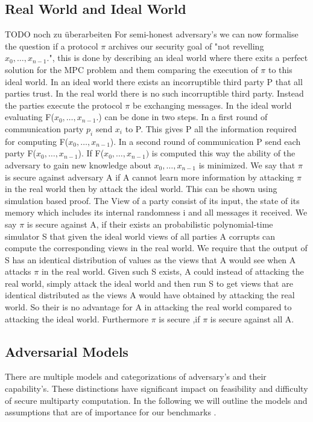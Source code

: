 \subsection{Real World and Ideal World}
TODO noch zu überarbeiten
For semi-honest adversary's we can now formalise the question if a protocol $ \pi $ archives our security goal of "not revelling $ x_0,\dots,x_{n-1}. $", this is done by describing an ideal world where there exits a perfect solution for the MPC problem and them comparing the execution of $ \pi $ to this ideal world. In an ideal world there exists an incorruptible third party P that all parties trust. In the real world there is no such incorruptible third party. Instead the parties execute the protocol $ \pi $ be exchanging messages.
In the ideal world evaluating F($ x_0,\dots,x_{n-1}. $) can be done in two steps. In a first round of communication party $ p_i $ send $x_i $ to P.
This gives P all the information required for computing F($ x_0,\dots,x_{n-1} $). In a second round of communication P send each party F($ x_0,\dots,x_{n-1} $).
If F($ x_0,\dots,x_{n-1}) $ is computed this way the ability of the adversary to gain new knowledge about $ x_0,\dots,x_{n-1} $ is minimized. We say that  $ \pi $ is secure against adversary A if A cannot learn more information by attacking $ \pi $ in the real world then by attack the ideal world. This can be shown using simulation based proof. 
The View of a party consist of its input, the state of its memory which includes its internal randomness i and all messages it received. 
We say $ \pi $ is secure against A,  if their exists an probabilistic polynomial-time simulator S that given the ideal world views of all parties A corrupts can compute the corresponding views in the real world. We require that the output of S has an identical distribution of values as the views that A would see when A attacks $ \pi $ in the real world. Given such S exists, A could instead of attacking the real world, simply attack the ideal world and then run S to get views that are identical distributed as the views A would have obtained by attacking the real world. So their is no advantage for A in attacking the real world compared to attacking the ideal world. Furthermore $ \pi $ is secure ,if $ \pi $ is secure against all A.       

\subsection{Adversarial Models}
There are multiple models and categorizations of adversary's and their capability's. These distinctions have significant impact on feasibility and difficulty of secure multiparty computation. In the following we will outline the models and assumptions that are of importance for our benchmarks  . 

